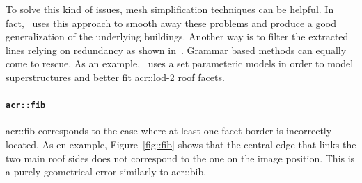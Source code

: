                 To solve this kind of issues, mesh simplification techniques can be helpful.
                In fact,~\textcite{verdie2015lod} uses this approach to smooth away these problems and produce a good generalization of the underlying buildings.
                Another way is to filter the extracted lines relying on redundancy as shown in~\textcite{michelin2013quality}.
                Grammar based methods can equally come to rescue.
                As an example,~\textcite{bredif20073d} uses a set parameteric models in order to model superstructures and better fit \gls{acr::lod}-2 roof facets.

            \paragraph{\texttt{\acrlong*{acr::fib}}}
                \gls{acr::fib} corresponds to the case where at least one facet border is incorrectly located.
                As en example, Figure~\ref{fig::fib} shows that the central edge that links the two main roof sides does not correspond to the one on the image position.
                This is a purely geometrical error similarly to \gls{acr::bib}.\\

                \begin{figure}[H]
                    \centering
                \end{figure}

